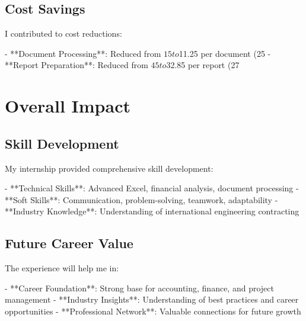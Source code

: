 \subsection{Cost Savings}
I contributed to cost reductions:

- **Document Processing**: Reduced from $15 to $11.25 per document (25%
- **Report Preparation**: Reduced from $45 to $32.85 per report (27%

\section{Overall Impact}

\subsection{Skill Development}
My internship provided comprehensive skill development:

- **Technical Skills**: Advanced Excel, financial analysis, document processing
- **Soft Skills**: Communication, problem-solving, teamwork, adaptability
- **Industry Knowledge**: Understanding of international engineering contracting

\subsection{Future Career Value}
The experience will help me in:

- **Career Foundation**: Strong base for accounting, finance, and project management
- **Industry Insights**: Understanding of best practices and career opportunities
- **Professional Network**: Valuable connections for future growth
